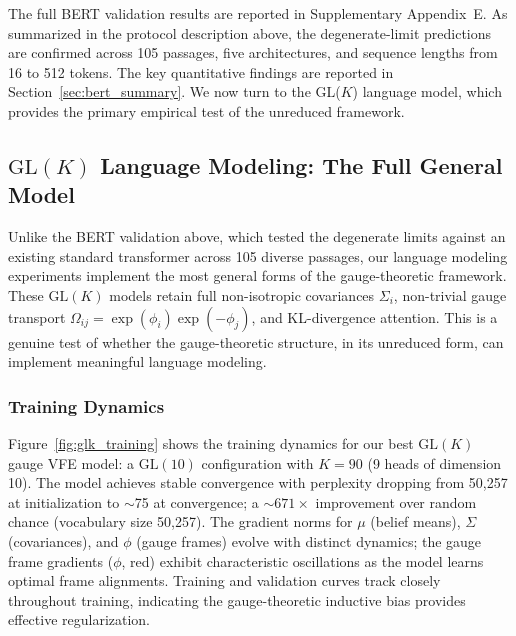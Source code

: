 \documentclass[twoside,11pt]{article}
\begin{document}
The full BERT validation results are reported in Supplementary Appendix~E. As summarized in the protocol description above, the degenerate-limit predictions are confirmed across 105 passages, five architectures, and sequence lengths from 16 to 512 tokens. The key quantitative findings are reported in Section~\ref{sec:bert_summary}. We now turn to the GL($K$) language model, which provides the primary empirical test of the unreduced framework.

\subsection{$\mathrm{GL}(K)$ Language Modeling: The Full General Model}
\label{sec:glk_lm}

Unlike the BERT validation above, which tested the degenerate limits against an existing standard transformer across 105 diverse passages, our language modeling experiments implement the most general forms of the gauge-theoretic framework. These $\mathrm{GL}(K)$ models retain full non-isotropic covariances $\Sigma_i$, non-trivial gauge transport $\Omega_{ij} = \exp(\phi_i)\exp(-\phi_j)$, and KL-divergence attention. This is a genuine test of whether the gauge-theoretic structure, in its unreduced form, can implement meaningful language modeling.

\subsubsection{Training Dynamics}

Figure~\ref{fig:glk_training} shows the training dynamics for our best $\mathrm{GL}(K)$ gauge VFE model: a $\mathrm{GL}(10)$ configuration with $K=90$ (9 heads of dimension 10). The model achieves stable convergence with perplexity dropping from 50,257 at initialization to $\sim$75 at convergence; a ${\sim}671\times$ improvement over random chance (vocabulary size 50{,}257). The gradient norms for $\mu$ (belief means), $\Sigma$ (covariances), and $\phi$ (gauge frames) evolve with distinct dynamics; the gauge frame gradients ($\phi$, red) exhibit characteristic oscillations as the model learns optimal frame alignments. Training and validation curves track closely throughout training, indicating the gauge-theoretic inductive bias provides effective regularization.
\end{document}
